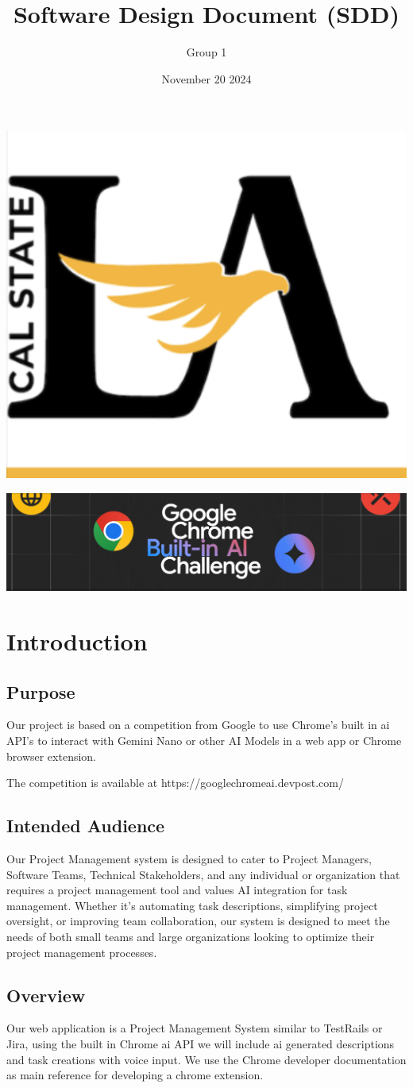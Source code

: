 \documentclass{article}
\title{Software Design Document (SDD)}
\author{Group 1 }
\date{November 20 2024}
\begin{document}
\maketitle  
\pagebreak

\tableofcontents
\pagebreak

\includegraphics[width=0.3\linewidth]{./logo/csula.png} 

\includegraphics[width=0.3\linewidth]{./logo/chromeai.png} 
\section{Introduction}

\subsection{Purpose}
Our project is based on a competition from Google to use Chrome's built in \Gls{ai} API's to interact with Gemini Nano or other AI Models in a web app or Chrome browser extension. 

The competition is available at https://googlechromeai.devpost.com/

\subsection{Intended Audience}
Our Project Management system is designed to cater to Project Managers, Software Teams, Technical Stakeholders, and any individual or organization that requires a project management tool and values AI integration for task management. Whether it's automating task descriptions, simplifying project oversight, or improving team collaboration, our system is designed to meet the needs of both small teams and large organizations looking to optimize their project management processes.


\subsection{Overview}
Our web application is a Project Management System similar to TestRails or Jira, using the built in Chrome \Gls{ai} API we will include ai generated descriptions and task creations with voice input. We use the Chrome developer documentation\cite{dev} as main reference for developing a chrome extension.
\end{document}

